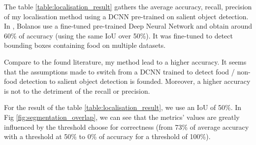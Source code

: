 The table \ref{table:localisation_result} gathers the average accuracy, recall, precision of my localisation method using a DCNN pre-trained on salient object detection. In \cite{Bolanos2016}, Bolanos use a fine-tuned pre-trained Deep Neural Network and obtain around 60\% of accuracy (using the same IoU over 50\%). It was fine-tuned to detect bounding boxes containing food on multiple datasets.

Compare to the found literature, my method lead to a higher accuracy. It seems that the assumptions made to switch from a DCNN trained to detect food / non-food detection to salient object detection is founded. Moreover, a higher accuracy is not to the detriment of the recall or precision.

For the result of the table \ref{table:localisation_result}, we use an IoU of 50\%. In Fig \ref{fig:segmentation_overlap}, we can see that the metrics' values are greatly influenced by the threshold choose for correctness (from 73\% of average accuracy with a threshold at 50\% to 0\% of accuracy for a threshold of 100\%).

